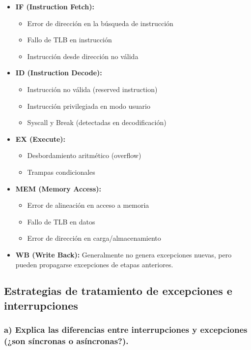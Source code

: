 \documentclass[12pt]{article}
\begin{document}
	\begin{itemize}
		\item \textbf{IF (Instruction Fetch):}
		\begin{itemize}
			\item Error de dirección en la búsqueda de instrucción
			\item Fallo de TLB en instrucción
			\item Instrucción desde dirección no válida
		\end{itemize}
		
		\item \textbf{ID (Instruction Decode):}
		\begin{itemize}
			\item Instrucción no válida (reserved instruction)
			\item Instrucción privilegiada en modo usuario
			\item Syscall y Break (detectadas en decodificación)
		\end{itemize}
		
		\item \textbf{EX (Execute):}
		\begin{itemize}
			\item Desbordamiento aritmético (overflow)
			\item Trampas condicionales
		\end{itemize}
		
		\item \textbf{MEM (Memory Access):}
		\begin{itemize}
			\item Error de alineación en acceso a memoria
			\item Fallo de TLB en datos
			\item Error de dirección en carga/almacenamiento
		\end{itemize}
		
		\item \textbf{WB (Write Back):} Generalmente no genera excepciones nuevas, pero pueden propagarse excepciones de etapas anteriores.
	\end{itemize}
	
	\subsection{Estrategias de tratamiento de excepciones e interrupciones}
	
	\subsubsection{a) Explica las diferencias entre interrupciones y excepciones (¿son síncronas o asíncronas?).}
	
\end{document}
